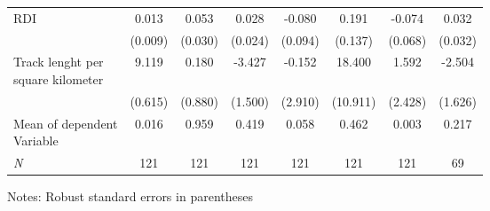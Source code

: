\begin{table}[H]
{\begin{threeparttable}
\begin{tabular}{lccccccc}
RDI                 &       0.013         &       0.053\sym{*}  &       0.028         &      -0.080         &       0.191         &      -0.074         &       0.032         \\
                    &     (0.009)         &     (0.030)         &     (0.024)         &     (0.094)         &     (0.137)         &     (0.068)         &     (0.032)         \\
\addlinespace
\makecell{Track lenght per \\ square kilometer}&       9.119\sym{***}&       0.180         &      -3.427\sym{**} &      -0.152         &      18.400\sym{*}  &       1.592         &      -2.504         \\
                    &     (0.615)         &     (0.880)         &     (1.500)         &     (2.910)         &    (10.911)         &     (2.428)         &     (1.626)         \\
\makecell{Mean of dependent \\ Variable}&       0.016         &       0.959         &       0.419         &       0.058         &       0.462         &       0.003         &       0.217         \\
\textit{N}          &         121         &         121         &         121         &         121         &         121         &         121         &          69         \\
\bottomrule[0.5pt]                                                                               \end{tabular}                                                                                                    \vspace{-2pt}                                                                                    \begin{tablenotes}[flushleft]{\setlength{\itemindent}{-3pt}}          \small                                                                                                           \item Notes: Robust standard errors in parentheses           \end{tablenotes}                                                                                         \end{threeparttable}                                                                             }                                                                                                                        \end{table}
